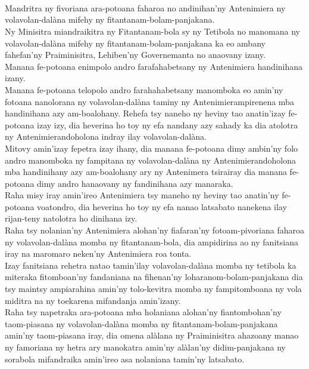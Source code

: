 \documentclass[12pt]{article}
\newcounter{laharana}
\newcommand{\andininy}[0]{
  \paragraph{%
    \NoCaseChange{%
      Andininy~\addtocounter{laharana}{1}\thelaharana.}\label{and:\thelaharana}~%
  }%
}
\begin{document}
\andininy{}Mandritra ny fivoriana ara-potoana faharoa no andinihan'ny
Antenimiera ny volavolan-dalàna mifehy ny fitantanam-bolam-panjakana.\\

\noindent
Ny Minisitra miandraikitra ny Fitantanam-bola sy ny Tetibola no manomana ny
volavolan-dalàna mifehy ny fitantanam-bolam-panjakana ka eo ambany fahefan'ny
Praiminisitra, Lehiben'ny Governemanta no anaovany izany.\\

\noindent
Manana fe-potoana enimpolo andro farafahabetsany ny Antenimiera handinihana
izany.\\

\noindent
Manana fe-potoana telopolo andro farahahabetsany manomboka eo amin'ny fotoana
nanolorana ny volavolan-dalàna taminy ny Antenimierampirenena mba handinihana
azy am-boalohany. Rehefa tsy naneho ny heviny tao anatin'izay fe-potoana izay
izy, dia heverina ho toy ny efa nandany azy sahady ka dia atolotra ny
Antenimierandoholona indray ilay volavolan-dalàna.\\

\noindent
Mitovy amin'izay fepetra izay ihany, dia manana fe-potoana dimy ambin'ny folo
andro manomboka ny fampitana ny volavolan-dalàna ny Antenimierandoholona mba
handinihany azy am-boalohany ary ny Antenimera tsirairay dia manana fe-potoana
dimy andro hanaovany ny fandinihana azy manaraka.\\

\noindent
Raha misy iray amin'ireo Antenimiera tsy maneho ny heviny tao anatin'ny
fe-potoana voatondro, dia heverina ho toy ny efa nanao latsabato nanekena ilay
rijan-teny natolotra ho dinihana izy.\\

\noindent
Raha tsy nolanian'ny Antenimiera alohan'ny fiafaran'ny fotoam-pivoriana faharoa
ny volavolan-dalàna momba ny fitantanam-bola, dia ampidirina ao ny fanitsiana
iray na maromaro neken'ny Antenimiera roa tonta.\\

\noindent
Izay fanitsiana rehetra natao tamin'ilay volavolan-dalàna momba ny tetibola ka
miteraka fitomboan'ny fandaniana na fihenan'ny loharanom-bolam-panjakana dia tsy
maintsy ampiarahina amin'ny tolo-kevitra momba ny fampitomboana ny vola miditra
na ny toekarena mifandanja amin'izany.\\

\noindent
Raha tsy napetraka ara-potoana mba holaniana alohan'ny fiantombohan'ny
taom-piasana ny volavolan-dalàna momba ny fitantanam-bolam-panjakana amin'ny
taom-piasana iray, dia omena alàlana ny Praiminisitra ahazoany manao ny
famoriana ny hetra ary manokatra amin'ny alàlan'ny didim-panjakana ny sorabola
mifandraika amin'ireo asa nolaniana tamin'ny latsabato.\\
\end{document}
